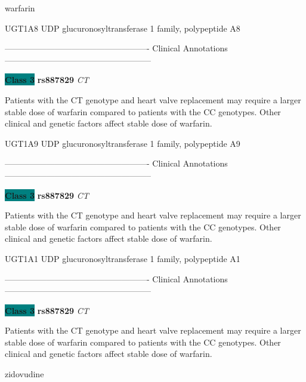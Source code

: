 \documentclass{resume} %
\begin{document}
\begin{rSection}{ warfarin }
\begin{rSubsection}{ UGT1A8 }{ UDP glucuronosyltransferase 1 family, polypeptide A8 }{}{}
\item[] ---------------------------------------------------- Clinical Annotations -----------------------------------------------------\newline
\item \textbf{\colorbox{teal} {Class 3}} \textbf{ rs887829 } \textit{ CT }
\item[] Patients with the CT genotype and heart valve replacement may require a larger stable dose of warfarin compared to patients with the CC genotypes. Other clinical and genetic factors affect stable dose of warfarin.
\end{rSubsection}\begin{rSubsection}{ UGT1A9 }{ UDP glucuronosyltransferase 1 family, polypeptide A9 }{}{}
\item[]

\item[] ---------------------------------------------------- Clinical Annotations -----------------------------------------------------\newline
\item \textbf{\colorbox{teal} {Class 3}} \textbf{ rs887829 } \textit{ CT }
\item[] Patients with the CT genotype and heart valve replacement may require a larger stable dose of warfarin compared to patients with the CC genotypes. Other clinical and genetic factors affect stable dose of warfarin.
\end{rSubsection}\begin{rSubsection}{ UGT1A1 }{ UDP glucuronosyltransferase 1 family, polypeptide A1 }{}{}
\item[]

\item[] ---------------------------------------------------- Clinical Annotations -----------------------------------------------------\newline
\item \textbf{\colorbox{teal} {Class 3}} \textbf{ rs887829 } \textit{ CT }
\item[] Patients with the CT genotype and heart valve replacement may require a larger stable dose of warfarin compared to patients with the CC genotypes. Other clinical and genetic factors affect stable dose of warfarin.
\end{rSubsection}

\end{rSection}\begin{rSection}{ zidovudine }
\item[]


\end{rSection}
\end{document}
